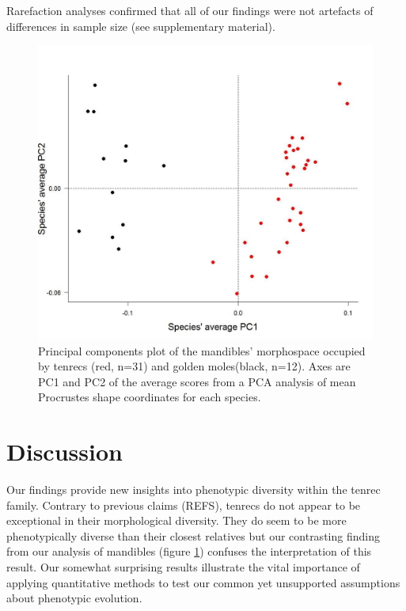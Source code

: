 \documentclass[12pt,a4paper]{article}
\begin{document}
Rarefaction analyses confirmed that all of our findings were not artefacts of differences in sample size (see supplementary material).


\begin{figure}[H]
\centering
\includegraphics[width=1\linewidth]{Mands_Tenrecs+Gmoles_PC1PC2_01_05_14.jpg}
\caption{Principal components plot of the mandibles' morphospace occupied by tenrecs (red, n=31) and golden moles(black, n=12). Axes are PC1 and PC2 of the average scores from a PCA analysis of mean Procrustes shape coordinates for each species. }
\label{mandsPCA}

\end{figure}



\section{Discussion}

Our findings provide new insights into phenotypic diversity within the tenrec family. Contrary to previous claims (REFS), tenrecs do not appear to be exceptional in their morphological diversity. They do seem to be more phenotypically diverse than their closest relatives but our contrasting finding from our analysis of mandibles (figure \ref{mandsPCA}) confuses the interpretation of this result. Our somewhat surprising results illustrate the vital importance of applying quantitative methods to test our common yet unsupported assumptions about phenotypic evolution.
\end{document}
